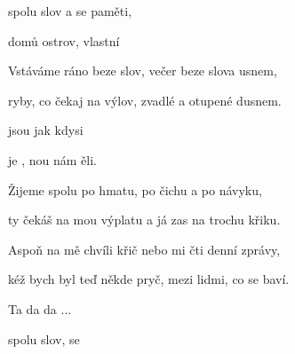 

\zs
{} spolu  slov a  se  paměti,

 domů  ostrov,  vlastní  
\ks

\zs
Vstáváme ráno beze slov, večer beze slova usnem,

ryby, co čekaj na výlov, zvadlé a otupené dusnem.
\ks

\zr
{} jsou jak   kdysi 

 je , nou nám ěli.
\kr

\zs
Žijeme spolu po hmatu, po čichu a po návyku,

ty čekáš na mou výplatu a já zas na trochu křiku.
\ks

\zs
Aspoň na mě chvíli křič nebo mi čti denní zprávy,

kéž bych byl teď někde pryč, mezi lidmi, co se baví.
\ks

\zr Ta da da ... \kr


 spolu  slov,  se 

\kp
